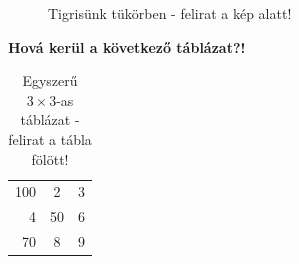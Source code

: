 \documentclass{article}
\begin{document}
\begin{figure}[h] %
\centering
{}
\caption{Tigrisünk tükörben - felirat a kép alatt!}
\end{figure}
%
\hulipsum[5-8]

\textbf{Hová kerül a következő táblázat?!}

\begin{table}
\centering
\caption{Egyszerű $3\times3$-as táblázat - felirat a tábla fölött!}	
	\begin{tabular}{|rcr|}
		\hline
		100 & 2 & 3 \\
		4 & 50 & 6 \\
		70 & 8 & 9 \\
		\hline
	\end{tabular}
\end{table}
%
\hulipsum[5-6]
\end{document}
